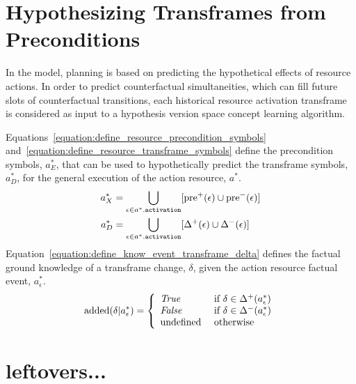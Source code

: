 \section{Hypothesizing Transframes from Preconditions}

In the model, planning is based on predicting the hypothetical effects
of resource actions.  In order to predict counterfactual
simultaneities, which can fill future slots of counterfactual
transitions, each historical resource activation transframe is
considered as input to a hypothesis version space concept learning
algorithm.

Equations\ \ref{equation:define_resource_precondition_symbols}
and\ \ref{equation:define_resource_transframe_symbols} define the
precondition symbols, $a^*_E$, that can be used to hypothetically
predict the transframe symbols, $a^*_D$, for the general execution of
the action resource, $a^*$.
\begin{align}
\label{equation:define_resource_precondition_symbols}
  a^*_X &= \bigcup_{\epsilon \in a^*.\text{\tt{activation}}} [\text{pre}^{+}(\epsilon) \cup \text{pre}^{-}(\epsilon)] \\
\label{equation:define_resource_transframe_symbols}
  a^*_D &= \bigcup_{\epsilon \in a^*.\text{\tt{activation}}} [\Delta^{+}(\epsilon) \cup \Delta^{-}(\epsilon)]
\end{align}
Equation\ \ref{equation:define_know_event_transframe_delta} defines
the factual ground knowledge of a transframe change, $\delta$, given
the action resource factual event, $a^*_\epsilon$.
\begin{equation}
\label{equation:define_know_event_transframe_delta}
   \text{added}(\delta | a^*_\epsilon) = \left\{\begin{array}{ll}
                                                 \text{\emph{True}}  & \text{~if $\delta \in \Delta^{+}(a^*_\epsilon)$} \\
                                                 \text{\emph{False}} & \text{~if $\delta \in \Delta^{-}(a^*_\epsilon)$} \\
                                                 \text{undefined}    & \text{~otherwise} \\
                                               \end{array}\right.
\end{equation}

\section{leftovers...}

